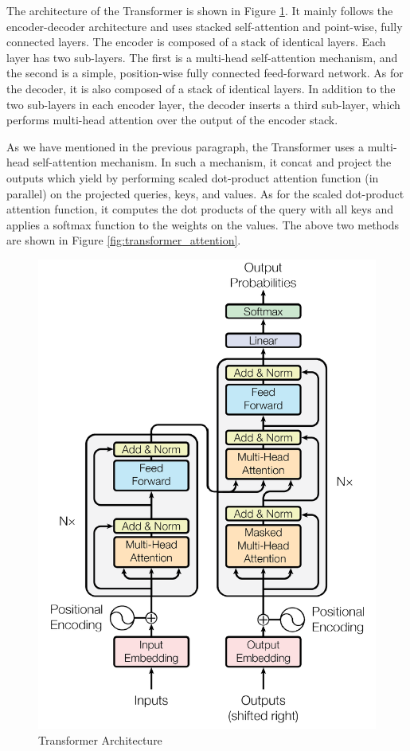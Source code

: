 \documentclass[10pt,journal,compsoc]{IEEEtran}
\begin{document}
The architecture of the Transformer is shown in Figure \ref{fig:transformer_architecture}. It mainly follows the encoder-decoder architecture and uses stacked self-attention and point-wise, fully connected layers. The encoder is composed of a stack of identical layers. Each layer has two sub-layers. The first is a multi-head self-attention mechanism, and the second is a simple, position-wise fully connected feed-forward network. As for the decoder, it is also composed of a stack of identical layers. In addition to the two sub-layers in each encoder layer, the decoder inserts a third sub-layer, which performs multi-head attention over the output of the encoder stack.

As we have mentioned in the previous paragraph, the Transformer uses a multi-head self-attention mechanism. In such a mechanism, it concat and project the outputs which yield by performing scaled dot-product attention function (in parallel) on the projected queries, keys, and values. As for the scaled dot-product attention function, it computes the dot products of the query with all keys and applies a softmax function to the weights on the values. The above two methods are shown in Figure \ref{fig:transformer_attention}.

\begin{figure}[!t]
  \centering
  \includegraphics[width=1\linewidth]{images/transformer_architecture.png}
  \caption{Transformer Architecture}
  \label{fig:transformer_architecture}
\end{figure}
\end{document}
